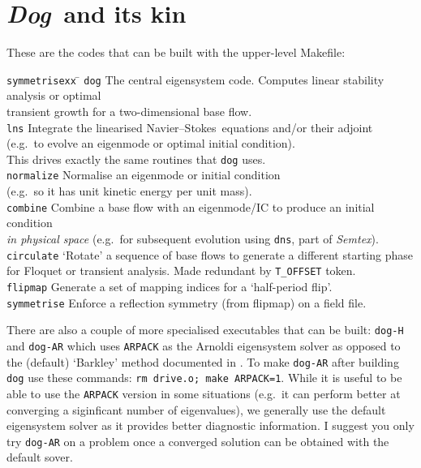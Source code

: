 \documentclass[11pt,a4paper]{report}
\newcommand\NavSto{Navier--Stokes}
\newcommand{\eg}{e.g.\ }
\newcommand{\Semtex}{\emph{Semtex}}
\newcommand{\Dog}{\emph{Dog}}
\begin{document}
\section{\Dog\ and its kin}

These are the codes that can be built with the upper-level Makefile:
\begin{tabbing}
\texttt{symmetrisexx} \= \kill
% 
\texttt{dog} 
\> The central eigensystem code. Computes linear stability analysis or 
optimal \\
\> transient growth for a two-dimensional base flow.\\
%
\texttt{lns} 
\> Integrate the linearised \NavSto\ equations and/or their adjoint\\ 
\> (\eg to evolve an eigenmode or optimal initial condition).\\ 
\> This drives exactly the same routines that \texttt{dog} uses.\\
%
\texttt{normalize} 
\> Normalise an eigenmode or initial condition \\
\> (\eg so it has unit kinetic energy per unit mass).\\
%
\texttt{combine} 
\> Combine a base flow with an eigenmode/IC to
produce an initial condition \\ \> \emph{in physical space} (\eg for
subsequent evolution using \texttt{dns}, part of \Semtex).\\
%
\texttt{circulate} 
\> `Rotate' a sequence of base flows to generate a different starting phase\\ 
\> for Floquet or transient analysis. 
   Made redundant by \verb+T_OFFSET+ token.\\
%
\texttt{flipmap} 
\> Generate a set of mapping indices for a `half-period flip'.\\
%
\texttt{symmetrise} 
\> Enforce a reflection symmetry (from flipmap) on a field file.
\end{tabbing}

There are also a couple of more specialised executables that can be
built: \texttt{dog-H} \citep[for computing stability with a
  half-period flip, see e.g.][]{bml05} and \texttt{dog-AR} which uses
\texttt{ARPACK} \citep{lehoucq98} as the Arnoldi eigensystem solver as
opposed to the (default) `Barkley' method documented in
\citet{bbs08b}.  To make \texttt{dog-AR} after building \texttt{dog}
use these commands: \verb+rm drive.o; make ARPACK=1+.  While it is
useful to be able to use the \texttt{ARPACK} version in some
situations (\eg it can perform better at converging a siginficant
number of eigenvalues), we generally use the default eigensystem
solver as it provides better diagnostic information.  I suggest you
only try \texttt{dog-AR} on a problem once a converged solution can be
obtained with the default sover.
\end{document}
